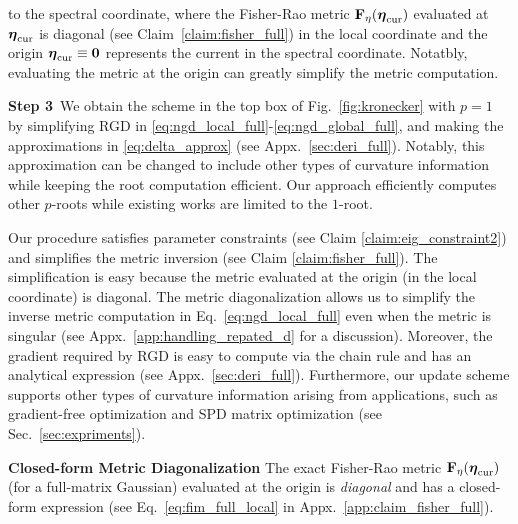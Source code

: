 to the spectral coordinate, where
the Fisher-Rao metric $\mbox{$\mbox{$\mathbf{F}$}$}_\eta(\mbox{$\mbox{$\boldsymbol{\eta}$}$}_\text{cur})$ evaluated at $\mbox{$\mbox{$\boldsymbol{\eta}$}$}_{\text{cur}}$ is diagonal  (see  Claim~\ref{claim:fisher_full}) in the local coordinate and the origin
$\mbox{$\mbox{$\boldsymbol{\eta}$}$}_{\text{cur}} \equiv \mathbf{0}$ represents the current  in the spectral coordinate.
Notatbly, evaluating the metric at the origin can greatly simplify the metric computation. 

%



{\bf Step 3}\, We obtain the scheme in
the top box of Fig.~\ref{fig:kronecker} with $p=1$
by simplifying RGD in \eqref{eq:ngd_local_full}-\eqref{eq:ngd_global_full}, and making the approximations in \eqref{eq:delta_approx}
(see  Appx.~\ref{sec:deri_full}).
Notably, this approximation can be changed to include other types of curvature information while keeping the root computation efficient.
Our approach efficiently computes  other $p$-roots while existing works \citep{lin2021tractable,
lin2023simplifying,
lincan2024,
tran2021variational,
tan2021analytic,godichon2024natural} are limited to the $1$-root.

Our procedure satisfies parameter constraints (see  Claim \ref{claim:eig_constraint2}) and simplifies the metric inversion (see  Claim  \ref{claim:fisher_full}). 
The simplification is easy because the metric
 evaluated at the origin (in the local coordinate) is diagonal. 
The metric diagonalization allows us to simplify the inverse metric computation in Eq.~\eqref{eq:ngd_local_full}
even when the metric is singular (see Appx.~\ref{app:handling_repated_d} for a discussion).
Moreover, the gradient 
%
required by RGD is easy to compute via the chain rule and has an analytical expression (see  Appx.~\ref{sec:deri_full}). 
Furthermore, our update scheme supports other types of curvature information arising from applications, such as gradient-free optimization and SPD matrix optimization (see Sec.~\ref{sec:expriments}).


\begin{claim}
\label{claim:fisher_full}
{\bf{Closed-form Metric Diagonalization}}
    The exact Fisher-Rao metric $\mbox{$\mbox{$\mathbf{F}$}$}_\eta(\mbox{$\mbox{$\boldsymbol{\eta}$}$}_\text{cur})$ (for a full-matrix Gaussian) evaluated at the origin  is \emph{diagonal} and has a closed-form expression   (see Eq.~\eqref{eq:fim_full_local} in  Appx.~\ref{app:claim_fisher_full}).
\end{claim}

